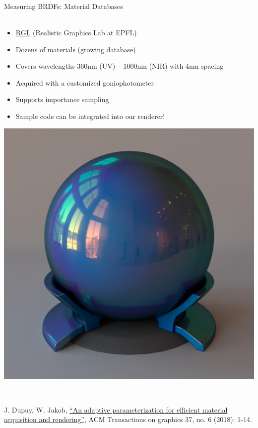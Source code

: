 \documentclass[utf8,stillsansserifmath,fleqn,t]{beamer}
\newcommand{\literature}[1]{{\tiny #1 \par}}
\begin{document}
\begin{frame}
\frametitle{\insertsection}
Measuring BRDFs: Material Databases\\~\\
\begin{minipage}{.52\textwidth}
\begin{itemize}
\item \href{https://rgl.epfl.ch/materials}{RGL} (Realistic Graphics Lab at EPFL)
\item Dozens of materials (growing database)
\item Covers wavelengths 360nm (UV) -- 1000nm (NIR) with 4nm spacing
\item Acquired with a customized goniophotometer
\item Supports importance sampling
\item Sample code can be integrated into our renderer!
\end{itemize}
\end{minipage}\hfill
\begin{minipage}{.46\textwidth}
\centerline{\includegraphics[width=\textwidth]{./fig/rgl.jpg}}
\end{minipage}\\[1ex]
\literature{J. Dupuy, W. Jakob, \href{http://dx.doi.org/10.1145/3272127.3275059}{``An adaptive
parameterization for efficient material acquisition and rendering''}, ACM
Transactions on graphics 37, no. 6 (2018): 1-14.}
\end{frame}
\end{document}
